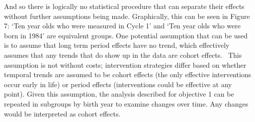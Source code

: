\documentclass [11pt]{article}
\begin{document}
And so there is logically no statistical procedure that can separate their effects without further assumptions being made. Graphically, this can be seen in Figure 7: `Ten year olds who were measured in Cycle 1' and `Ten year olds who were born in 1984' are equivalent groups. One potential assumption that can be used is to assume that long term period effects have no trend, which effectively assumes that any trends that do show up in the data are cohort effects.~\cite{Bell2016-el} This assumption is not without costs; intervention strategies differ based on whether temporal trends are assumed to be cohort effects (the only effective interventions occur early in life) or period effects (interventions could be effective at any point). Given this assumption, the analysis described for objective 1 can be repeated in subgroups by birth year to examine changes over time. Any changes would be interpreted as cohort effects.  
\end{document}
